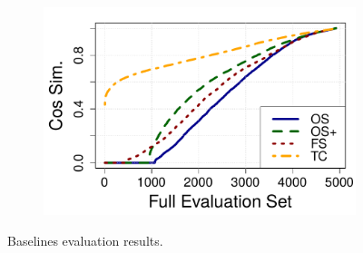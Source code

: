 \begin{figure}[t!]
\begin{subfigure}{.5\textwidth}
\end{subfigure}%
\begin{subfigure}{.5\textwidth}
\includegraphics[width=\linewidth]{img/cos_sim_full.pdf}
\end{subfigure}
\setlength{\abovecaptionskip}{-0.0005pt}
\caption{Baselines evaluation results.}
\label{fig:eval}
\end{figure}


